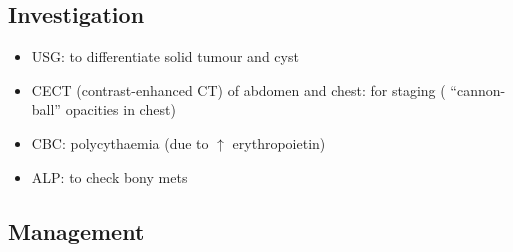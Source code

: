 \documentclass[
  12pt,
]{memoir}
\providecommand{\tightlist}{%
  \setlength{\itemsep}{0pt}\setlength{\parskip}{0pt}}
\begin{document}
\hypertarget{investigation-28}{%
\subsection{Investigation}\label{investigation-28}}

\begin{itemize}
\tightlist
\item
  USG: to differentiate solid tumour and cyst
\item
  CECT (contrast-enhanced CT) of abdomen and chest: for staging (
  ``cannon-ball'' opacities in chest)
\item
  CBC: polycythaemia (due to \(\uparrow\) erythropoietin)
\item
  ALP: to check bony mets
\end{itemize}

\hypertarget{management-19}{%
\subsection{Management}\label{management-19}}
\end{document}
